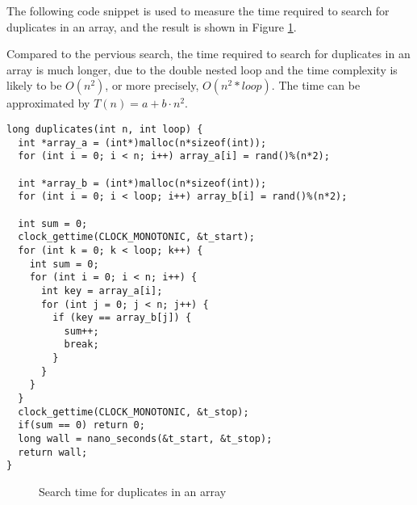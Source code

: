 \documentclass[a4paper,11pt]{article}
\begin{document}
The following code snippet is used to measure the time required to search for duplicates in an array,
and the result is shown in Figure \ref{fig:search_duplicate}.

Compared to the pervious search, the time required to search for duplicates in an array is much longer, 
due to the double nested loop and the time complexity is likely to be $O(n^2)$, or more precisely, $O(n^2 * loop)$.
The time can be approximated by $T(n) = a + b \cdot n^2$.

\begin{verbatim}
long duplicates(int n, int loop) {
  int *array_a = (int*)malloc(n*sizeof(int));
  for (int i = 0; i < n; i++) array_a[i] = rand()%(n*2);

  int *array_b = (int*)malloc(n*sizeof(int));
  for (int i = 0; i < loop; i++) array_b[i] = rand()%(n*2);

  int sum = 0;
  clock_gettime(CLOCK_MONOTONIC, &t_start);
  for (int k = 0; k < loop; k++) {
    int sum = 0;
    for (int i = 0; i < n; i++) {
      int key = array_a[i];
      for (int j = 0; j < n; j++) {
        if (key == array_b[j]) {
          sum++;
          break;
        }
      }
    }
  }
  clock_gettime(CLOCK_MONOTONIC, &t_stop);
  if(sum == 0) return 0;
  long wall = nano_seconds(&t_start, &t_stop);
  return wall;
}
\end{verbatim}

\begin{figure}[H]
  \centering
  \caption{Search time for duplicates in an array}
  \label{fig:search_duplicate}
\end{figure}
\end{document}
